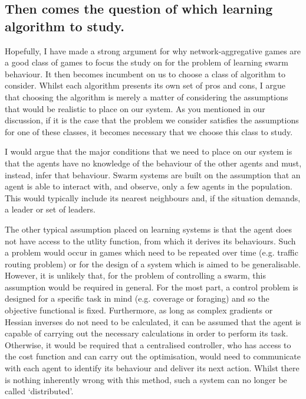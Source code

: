\documentclass{article}
\begin{document}
\subsection*{Then comes the question of which learning algorithm to study.} %

Hopefully, I have made a strong argument for why network-aggregative
games are a good class of games to focus the study on for the problem
of learning swarm behaviour. It then becomes incumbent on us to choose
a class of algorithm to consider. Whilst each algorithm presents its
own set of pros and cons, I argue that choosing the algorithm is
merely a matter of considering the assumptions that would be realistic
to place on our system. As you mentioned in our discussion, if it is
the case that the problem we consider satisfies the assumptions for
one of these classes, it becomes necessary that we choose this class
to study.

I would argue that the major conditions that we need to place on our
system is that the agents have no knowledge of the behaviour of the
other agents and must, instead, infer that behaviour. Swarm systems
are built on the assumption that an agent is able to interact with,
and observe, only a few agents in the population. This would typically
include its nearest neighbours and, if the situation demands, a leader
or set of leaders.

The other typical assumption placed on learning systems is that the
agent does not have access to the utlity function, from which it
derives its behaviours. Such a problem would occur in games which need
to be repeated over time (e.g. traffic routing problem) or for the
design of a system which is aimed to be generalisable. However, it is
unlikely that, for the problem of controlling a swarm, this assumption
would be required in general. For the most part, a control problem is
designed for a specific task in mind (e.g. coverage or foraging) and
so the objective functional is fixed.  Furthermore, as long as complex
gradients or Hessian inverses do not need to be calculated, it can be
assumed that the agent is capable of carrying out the necessary
calculations in order to perform its task. Otherwise, it would be
required that a centralised controller, who has access to the cost
function and can carry out the optimisation, would need to communicate
with each agent to identify its behaviour and deliver its next
action. Whilst there is nothing inherently wrong with this method,
such a system can no longer be called `distributed'.
\end{document}
